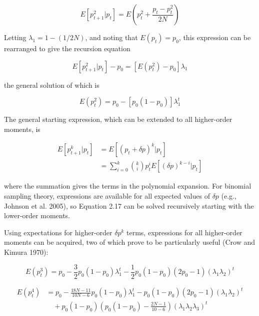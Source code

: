 \documentclass{article}
\begin{document}
\begin{equation}
E[p_{t+1}^{2}|p_{t}]=E\left(p_{t}^{2}+\frac{p_{t}-p_{t}^{2}}{2N}\right)
\end{equation}

Letting  $ \lambda_{1}=1-(1/2N) $, and noting that  $ E(p_{t})=p_{0} $, this expression can be rearranged to give the recursion equation

\begin{equation}
E[p_{t+1}^{2}|p_{t}]-p_{0}=[E(p_{t}^{2})-p_{0}]\lambda_{1}
\end{equation}

the general solution of which is

\begin{equation}
E(p_{t}^{2})=p_{0}-[p_{0}(1-p_{0})]\lambda_{1}^{t}
\tag{2.16a}
\label{eq:2_16a}
\end{equation}

The general starting expression, which can be extended to all higher-order moments, is

\begin{equation}
\begin{aligned}E[p_{t+1}^{k}|p_{t}]&=E[(p_{t}+\delta p)^{k}|p_{t}]\\&=\sum_{i=0}^{k}\binom{k}{i}p_{t}^{i}E\left[(\delta p)^{k-i}|p_{t}\right]\end{aligned}
\tag{2.16b}
\label{eq:2_16b}
\end{equation}

where the summation gives the terms in the polynomial expansion. For binomial sampling theory, expressions are available for all expected values of  $ \delta p $ (e.g., Johnson et al. 2005), so Equation 2.17 can be solved recursively starting with the lower-order moments.

Using expectations for higher-order  $ \delta p^{k} $ terms, expressions for all higher-order moments can be acquired, two of which prove to be particularly useful (Crow and Kimura 1970):

\begin{equation}
E(p_{t}^{3})=p_{0}-\frac{3}{2}p_{0}(1-p_{0})\lambda_{1}^{t}-\frac{1}{2}p_{0}(1-p_{0})(2p_{0}-1)(\lambda_{1}\lambda_{2})^{t}
\tag{2.16c}
\label{eq:2_16c}
\end{equation}

\begin{equation}
\begin{aligned}E(p_{t}^{4})&=p_{0}-\frac{18N-11}{10N-6}p_{0}(1-p_{0})\lambda_{1}^{t}-p_{0}(1-p_{0})(2p_{0}-1)(\lambda_{1}\lambda_{2})^{t}\\&\quad+p_{0}(1-p_{0})\left(p_{0}(1-p_{0})-\frac{2N-1}{10-6}\right)(\lambda_{1}\lambda_{2}\lambda_{3})^{t}\end{aligned}
\tag{2.16d}
\label{eq:2_16d}
\end{equation}
\end{document}
